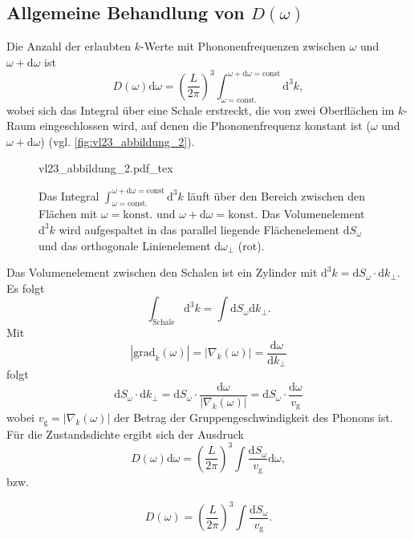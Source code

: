 \subsection{Allgemeine Behandlung von \texorpdfstring{$D(\omega)$}{D(omega)}}
	Die Anzahl der erlaubten $k$-Werte mit Phononenfrequenzen zwischen $\omega $ und $\omega + \mathrm{d} \omega$ ist
	$$
	D(\omega) \text{d}\omega = \left( \frac{L}{2\pi} \right) ^3 \int_{\omega=\text{const.}}^{\omega+\mathrm{d}\omega=\text{const}} \mathrm{d}^{3}k,
	$$ 
	wobei sich das Integral über eine Schale erstreckt, die von zwei Oberflächen im $k$-Raum eingeschlossen wird, auf denen die Phononenfrequenz konstant ist ($\omega$ und $\omega + \mathrm{d}\omega$) (vgl. \autoref{fig:vl23_abbildung_2}).

	\begin{figure}[H]
		\centering
		\def\svgwidth{.499\columnwidth}
		{vl23_abbildung_2.pdf_tex}
		\caption{Das Integral $\int_{\omega=\text{const.}}^{\omega+\mathrm{d}\omega=\text{const}} \mathrm{d}^{3}k$ läuft über den Bereich zwischen den Flächen mit $\omega=\mathrm{konst.}$ und $\omega+\mathrm d\omega=\mathrm{konst.}$
			Das Volumenelement $\mathrm d^3k$ wird aufgespaltet in das parallel liegende Flächenelement $\mathrm dS_\omega$ und das orthogonale Linienelement $\mathrm d\omega_\perp$ (rot).
		}
		\label{fig:vl23_abbildung_2}
	\end{figure}

	Das Volumenelement zwischen den Schalen ist ein Zylinder mit $\mathrm{d}^3k = \mathrm{d}S_{\omega} \cdot \mathrm{d} k_{\perp}$. 
	Es folgt
	$$
	\int_{\text{Schale}} \mathrm{d}^3 k = \int \mathrm{d}S_{\omega} \mathrm{d}k_{\perp}.
	$$
	Mit 
	$$
	\left| \mathrm{grad}_{k}(\omega) \right| = \left| \nabla _{k} (\omega) \right| = \frac{\mathrm{d}\omega}{\mathrm{d} k_{\perp}}
	$$ 
	folgt
	$$
	\mathrm{d} S_{\omega} \cdot \mathrm{d}k_{\perp} = \mathrm{d} S_{\omega} \cdot \frac{\mathrm{d}\omega}{\left| \nabla _{k} (\omega) \right| } = \mathrm{d}S_{\omega} \cdot \frac{\mathrm{d}\omega}{v_\mathrm{g}}
	$$ 
	wobei $v_{\mathrm{g}} = \left| \nabla _{k} (\omega) \right| $ der Betrag der Gruppengeschwindigkeit des Phonons ist. Für die Zustandsdichte ergibt sich der Ausdruck
	$$
	D(\omega) \mathrm{d}\omega = \left( \frac{L}{2\pi} \right) ^3 \int \frac{\mathrm{d}S_{\omega}}{v_{\mathrm{g}}} \mathrm{d} \omega,
	$$ 
	bzw.
	\begin{important}
		\begin{equation}
			\label{eq:II.6.2}
			D(\omega) = \left( \frac{L}{2\pi} \right) ^3 \int \frac{\mathrm{d}S_{\omega}}{v_{\mathrm{g}}}.
		\end{equation}
	\end{important}

